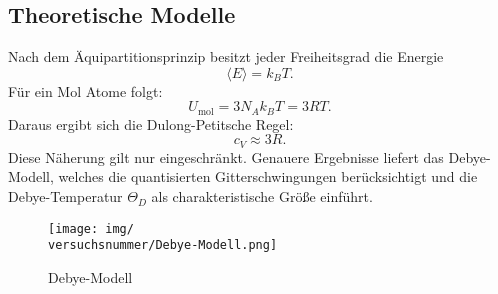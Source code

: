 \subsection*{Theoretische Modelle}
Nach dem Äquipartitionsprinzip besitzt jeder Freiheitsgrad die Energie
\begin{equation}
    \langle E \rangle = k_B T.
    \label{eq:aquipartition}
\end{equation}
Für ein Mol Atome folgt:
\begin{equation}
    U_{\text{mol}} = 3 N_A k_B T = 3 R T.
    \label{eq:energie_mol}
\end{equation}
Daraus ergibt sich die Dulong-Petitsche Regel:
\begin{equation}
    c_V \approx 3R.
    \label{eq:dulong_petit}
\end{equation}
Diese Näherung gilt nur eingeschränkt. Genauere Ergebnisse liefert das Debye-Modell, welches die quantisierten Gitterschwingungen berücksichtigt und die Debye-Temperatur \(\Theta_D\) als charakteristische Größe einführt.

\begin{figure}[h!]
    \centering
    \texttt{[image: img/\\versuchsnummer/Debye-Modell.png]}
    \caption{Debye-Modell}
    \label{img:de_mod}
\end{figure}
